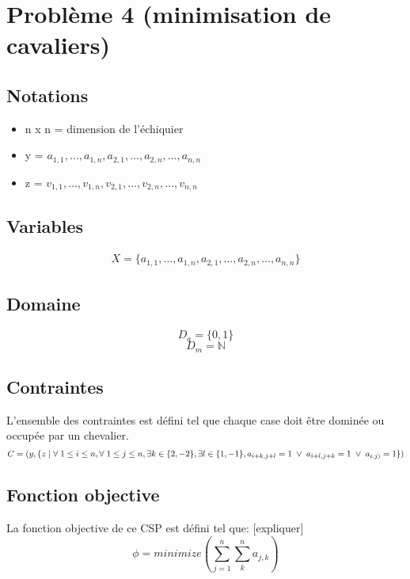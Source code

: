 \documentclass[a4paper,11pt]{article}
\begin{document}
\section{Problème 4 (minimisation de cavaliers)}
\subsection{Notations}
\begin{itemize}
\item n x n = dimension de l'échiquier
\item y = $a_{1,1},\ldots, a_{1,n},a_{2,1}, \ldots,a_{2,n}, \ldots, a_{n,n} $
\item z = $v_{1,1},\ldots, v_{1,n},v_{2,1}, \ldots,v_{2,n}, \ldots, v_{n,n} $
\end{itemize}

\subsection{Variables}
\begin{equation}
  \begin{split}
    X = \{a_{1,1},\ldots, a_{1,n},a_{2,1}, \ldots,a_{2,n}, \ldots, a_{n,n} \}
  \end{split}
\end{equation}

\subsection{Domaine}
$$D_a = \{ 0, 1 \}$$
$$D_m = \mathbb{N}$$

\subsection{Contraintes}
L'ensemble des contraintes est défini tel que chaque case doit être dominée ou occupée par un chevalier. 
  $$ C = (y, \{z \hspace{0.1cm} | \hspace{0.1cm} \forall \hspace{0.1cm} 1 \leq i \leq n, \forall \hspace{0.1cm} 1 \leq j \leq n, \exists k \in \{2,-2\}, \exists l \in \{1,-1\}, a_{i+k,j+l}=1 \hspace{0.1cm} \vee \hspace{0.1cm} a_{i+l,j+k}=1 \hspace{0.1cm} \vee \hspace{0.1cm} a_{i,j)} = 1\}) $$ 

\subsection{Fonction objective}

La fonction objective de ce CSP est défini tel que: [expliquer]
  $$ \phi = minimize(\sum_{j=1}^{n} \sum_{k}^n a_{j,k}) $$
  
\end{document}

